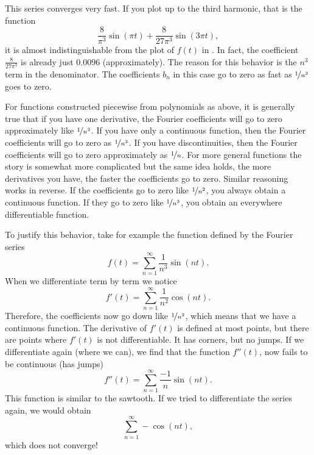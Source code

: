 \begin{example}
This series converges very fast.
If you plot up
to the third harmonic, that is the function
\begin{equation*}
\frac{8}{\pi^3} \sin (\pi t) + 
\frac{8}{27 \pi^3} \sin (3 \pi t) ,
\end{equation*}
it is almost indistinguishable from the plot of $f(t)$ in
.
In fact, the coefficient 
$\frac{8}{27 \pi^3}$ is already just 0.0096 (approximately).
The reason for this behavior is the $n^3$ term in the denominator.
The coefficients $b_n$ in this case go to zero as fast as
$\nicefrac{1}{n^3}$ goes to
zero.
\end{example}

For functions constructed piecewise from polynomials as above,
it is generally true that
if you have one derivative, the Fourier
coefficients will go to zero approximately like $\nicefrac{1}{n^3}$.  If you
have only a continuous function, then the Fourier coefficients will go to
zero as $\nicefrac{1}{n^2}$.  If you have discontinuities, then 
the Fourier coefficients will go to zero approximately as $\nicefrac{1}{n}$.
For more general functions the story is somewhat more complicated but the
same idea holds, the more derivatives you have, the faster the coefficients
go to zero.  Similar reasoning works in reverse.  If the coefficients go to
zero like $\nicefrac{1}{n^2}$, you always obtain a continuous function.  If
they go to zero like $\nicefrac{1}{n^3}$, you obtain an everywhere differentiable
function.

To justify this behavior, take for example the function defined by
the Fourier series
\begin{equation*}
f(t) = \sum_{n=1}^\infty \frac{1}{n^3} \sin (n t) .
\end{equation*}
When we differentiate term by term we notice
\begin{equation*}
f'(t) = \sum_{n=1}^\infty \frac{1}{n^2} \cos (n t) .
\end{equation*}
Therefore, the coefficients now go down like $\nicefrac{1}{n^2}$, which 
means that we have a continuous function.
The derivative 
of $f'(t)$ is defined
at most points, but there are points where $f'(t)$ is not differentiable.
It has corners, but no jumps.
If we
differentiate again (where we can), we find that the function
$f''(t)$,
now fails to be continuous (has jumps)
\begin{equation*}
f''(t) = \sum_{n=1}^\infty \frac{-1}{n} \sin (n t) .
\end{equation*}
This function is similar to the sawtooth.  If we tried to differentiate
the series again, we would obtain
\begin{equation*}
\sum_{n=1}^\infty -\cos (n t) ,
\end{equation*}
which does not converge!

